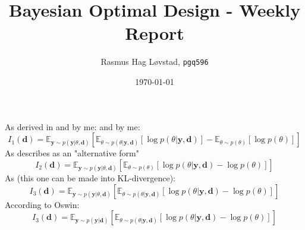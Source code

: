 \documentclass[12pt,usenames]{article}
\title{Bayesian Optimal Design - Weekly Report}
\author{Rasmus Hag Løvstad, \texttt{pgq596}}
\date{\today}
\newcommand{\B}[1]{\mathbf{#1}}
\begin{document}
\maketitle
\tableofcontents
As derived in \citet{lindley56} and by me: and by me:
\begin{equation}
  I_1(\B{d}) = \mathbb{E}_{\B{y} \sim p(\B{y} | \theta, \B{d})} \left[\mathbb{E}_{\theta \sim p(\theta | \B{y}, \B{d})}[\log p(\theta | \B{y}, \B{d})] - \mathbb{E}_{\theta \sim p(\theta)} \left[ \log p(\theta) \right] \right]
\end{equation}
As \citet{lindley56} describes as an "alternative form"
\begin{equation}
  I_2(\B{d}) = \mathbb{E}_{\B{y} \sim p(\B{y} | \theta, \B{d})} \left[\mathbb{E}_{\theta \sim p(\theta)}[\log p(\theta | \B{y}, \B{d}) - \log p(\theta)] \right]
\end{equation}
As \citet{ryan15} (this one can be made into KL-divergence):
\begin{equation}
  I_3(\B{d}) = \mathbb{E}_{\B{y} \sim p(\B{y} | \theta, \B{d})} \left[\mathbb{E}_{\theta \sim p(\theta | \B{y}, \B{d})}[\log p(\theta | \B{y}, \B{d}) - \log p(\theta)] \right]
\end{equation}
According to Oswin:
\begin{equation}
  I_3(\B{d}) = \mathbb{E}_{\B{y} \sim p(\B{y} | \B{d})} \left[\mathbb{E}_{\theta \sim p(\theta | \B{y}, \B{d})}[\log p(\theta | \B{y}, \B{d}) - \log p(\theta)] \right]
\end{equation}







\printbibliography[heading=bibintoc]
\end{document}
